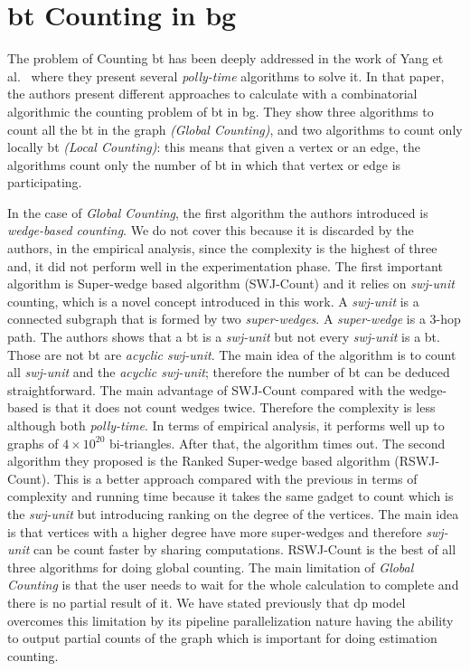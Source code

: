 \section{\acrlong{bt} Counting in \acrlong{bg}}\label{sec:rel-work:counting}
The problem of Counting \acrshort{bt} has been deeply addressed in the work of Yang et al.~\cite{btcount} where they present several \emph{polly-time} algorithms to solve it.
In that paper, the authors present different approaches to calculate with a combinatorial algorithmic the counting problem of \acrshort{bt} in \acrshort{bg}. 
They show three algorithms to count all the \acrshort{bt} in the graph \emph{(Global Counting)}, and two algorithms to count only locally \acrshort{bt} \emph{(Local Counting)}: this means that given a vertex or an edge, the algorithms count only the number of \acrshort{bt} in which 
that vertex or edge is participating.

In the case of \emph{Global Counting}, the first algorithm the authors introduced is \emph{wedge-based counting}. We do not cover this because it is discarded
by the authors, in the empirical analysis, since the complexity is the highest of three and, it did not perform well in the experimentation phase.
The first important algorithm is Super-wedge based algorithm (SWJ-Count) and it relies on \emph{swj-unit} counting, which is a novel concept introduced in this work. A \emph{swj-unit} is a connected subgraph that is formed by two \emph{super-wedges}. A \emph{super-wedge}
is a 3-hop path. The authors shows that a \acrshort{bt} is a \emph{swj-unit} but not every \emph{swj-unit} is a \acrshort{bt}. Those 
are not \acrshort{bt} are \emph{acyclic swj-unit}. The main idea of the algorithm is to count all \emph{swj-unit} and the \emph{acyclic swj-unit}; therefore
the number of \acrshort{bt} can be deduced straightforward.
The main advantage of SWJ-Count compared with the wedge-based is that it does not count wedges twice.
Therefore the complexity is less although both \emph{polly-time}.
In terms of empirical analysis, it performs well up to graphs of $4 \times 10^20$ bi-triangles. After that, the algorithm times out.
The second algorithm they proposed is the Ranked Super-wedge based algorithm (RSWJ-Count). This is a better approach compared with the previous in terms of complexity and running time because it takes the same gadget to count which is the \emph{swj-unit} but introducing ranking on the degree of the vertices. The main idea is that vertices with a higher degree have more super-wedges 
and therefore \emph{swj-unit} can be count faster by sharing computations. RSWJ-Count is the best of all three algorithms for doing global counting.
The main limitation of \emph{Global Counting} is that the user needs to wait for the whole calculation to complete and there is no partial result of it.
We have stated previously that \acrshort{dp} model overcomes this limitation by its pipeline parallelization nature having the ability to output partial counts of the graph which is important for doing estimation counting.


